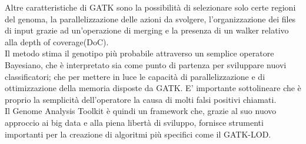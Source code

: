 Altre caratteristiche di GATK sono la possibilità di selezionare solo certe regioni del genoma, la parallelizzazione delle azioni da svolgere, l'organizzazione dei files di input grazie ad un'operazione di merging e la presenza di un walker relativo alla depth of coverage(DoC).\\
Il metodo stima il genotipo più probabile attraverso un semplice operatore Bayesiano, che è interpretato sia come punto di partenza per sviluppare nuovi classificatori; che per mettere in luce le capacità di parallelizzazione e di ottimizzazione della memoria disposte da GATK. E' importante sottolineare che è proprio la semplicità dell'operatore la causa di molti falsi positivi chiamati.\\
Il Genome Analysis Toolkit è quindi un framework che, grazie al suo nuovo approccio ai big data e alla piena libertà di sviluppo, fornisce strumenti importanti per la creazione di algoritmi più specifici come il GATK-LOD. 

